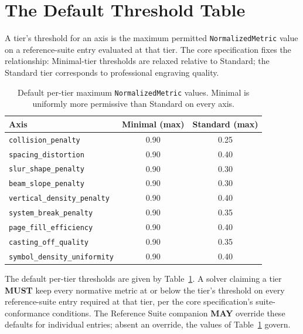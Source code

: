 \documentclass[11pt,letterpaper]{report}
\newcommand{\tablenums}[1]{{\addfontfeatures{Numbers={Lining,Tabular}}#1}}
\newcounter{requirement}[chapter]
\newcommand{\MUST}{\textbf{MUST}}
\newcommand{\MAY}{\textbf{MAY}}
\begin{document}
\section{The Default Threshold Table}
\label{sec:thresholds:table}

A tier's threshold for an axis is the maximum permitted
\texttt{NormalizedMetric} value on a reference-suite entry evaluated at
that tier. The core specification fixes the relationship: Minimal-tier
thresholds are relaxed relative to Standard; the Standard tier corresponds
to professional engraving quality.

\begin{table}[h]
\centering
\small
\begin{tabular}{lcc}
\toprule
\textbf{Axis} & \textbf{Minimal (max)} & \textbf{Standard (max)} \\
\midrule
\texttt{collision\_penalty}          & \tablenums{0.90} & \tablenums{0.25} \\
\texttt{spacing\_distortion}         & \tablenums{0.90} & \tablenums{0.40} \\
\texttt{slur\_shape\_penalty}        & \tablenums{0.90} & \tablenums{0.30} \\
\texttt{beam\_slope\_penalty}        & \tablenums{0.90} & \tablenums{0.30} \\
\texttt{vertical\_density\_penalty}  & \tablenums{0.90} & \tablenums{0.40} \\
\texttt{system\_break\_penalty}      & \tablenums{0.90} & \tablenums{0.35} \\
\texttt{page\_fill\_efficiency}      & \tablenums{0.90} & \tablenums{0.40} \\
\texttt{casting\_off\_quality}       & \tablenums{0.90} & \tablenums{0.35} \\
\texttt{symbol\_density\_uniformity} & \tablenums{0.90} & \tablenums{0.40} \\
\bottomrule
\end{tabular}
\caption{Default per-tier maximum \texttt{NormalizedMetric} values.
Minimal is uniformly more permissive than Standard on every axis.}
\label{tab:tier-thresholds}
\end{table}

\begin{requirement}
\label{req:qmc:thresholds}
The default per-tier thresholds are given by
Table~\ref{tab:tier-thresholds}. A solver claiming a tier \MUST{} keep
every normative metric at or below the tier's threshold on every
reference-suite entry required at that tier, per the core specification's
suite-conformance conditions. The Reference Suite companion \MAY{}
override these defaults for individual entries; absent an override, the
values of Table~\ref{tab:tier-thresholds} govern.
\end{requirement}
\end{document}
